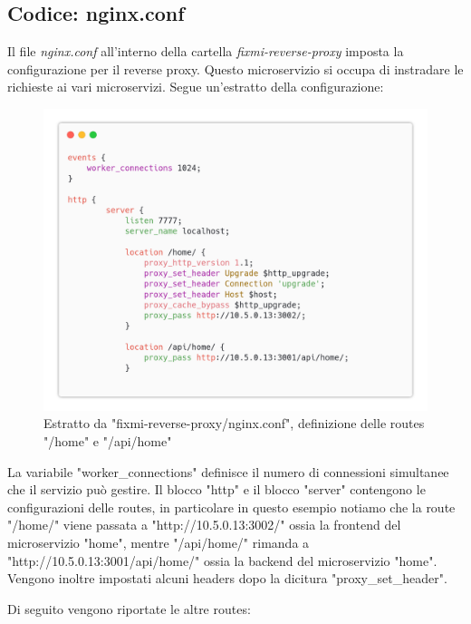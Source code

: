 \documentclass{report}
\begin{document}
\subsection*{Codice: nginx.conf}

Il file \textit{nginx.conf} all'interno della cartella \textit{fixmi-reverse-proxy} imposta la configurazione per il reverse proxy. Questo microservizio si occupa di instradare le richieste ai vari microservizi. Segue un'estratto della configurazione:


\begin{figure}[H]
	\centering\includegraphics[width=1\textwidth]{images/nginx_config_home.png}
	Estratto da "fixmi-reverse-proxy/nginx.conf", definizione delle routes "/home" e "/api/home"
\end{figure}

La variabile "worker\_connections" definisce il numero di connessioni simultanee che il servizio può gestire. Il blocco "http" e il blocco "server" contengono le configurazioni delle routes, in particolare in questo esempio notiamo che la route "/home/" viene passata a "http://10.5.0.13:3002/" ossia la frontend del microservizio "home", mentre "/api/home/" rimanda a "http://10.5.0.13:3001/api/home/" ossia la backend del microservizio "home". Vengono inoltre impostati alcuni headers dopo la dicitura "proxy\_set\_header".

Di seguito vengono riportate le altre routes:
\end{document}
